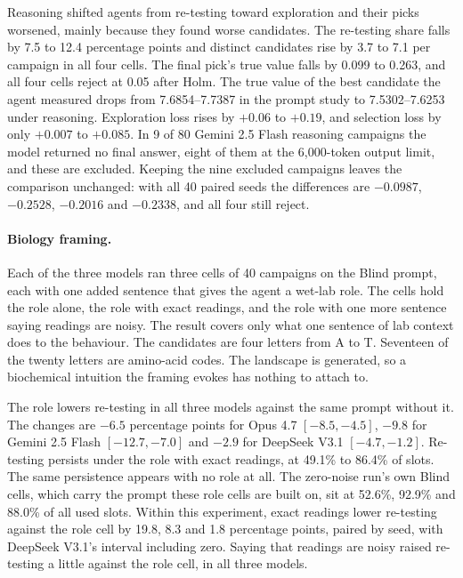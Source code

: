 Reasoning shifted agents from re-testing toward exploration and their picks worsened, mainly because they
found worse candidates. The re-testing share falls by 7.5 to 12.4 percentage points and distinct candidates
rise by 3.7 to 7.1 per campaign in all four cells. The final pick's true value falls by 0.099 to 0.263,
and all four cells reject at 0.05 after Holm. The true value of the best candidate the agent measured drops
from 7.6854--7.7387 in the prompt study to 7.5302--7.6253 under reasoning. Exploration loss rises by $+0.06$ to $+0.19$, and selection loss by only $+0.007$ to $+0.085$. In 9 of 80 Gemini 2.5 Flash reasoning campaigns the model returned no final answer, eight of them at the 6{,}000-token output limit, and these are excluded. Keeping the nine excluded campaigns
leaves the comparison unchanged: with all 40 paired seeds the differences are $-0.0987$, $-0.2528$,
$-0.2016$ and $-0.2338$, and all four still reject.



\paragraph{Biology framing.}
\label{app:bio}
Each of the three models ran three cells of 40 campaigns on the Blind prompt, each with one added sentence that gives the agent a wet-lab role. The cells hold the role alone, the role with exact readings, and the role with one more sentence saying readings are noisy. The result covers only what one sentence of lab context does to the behaviour. The candidates are four letters from A to T. Seventeen of the twenty letters are amino-acid codes. The landscape is generated, so a biochemical intuition the framing evokes has nothing to attach to.

The role lowers re-testing in all three models against the same prompt without it. The changes are $-6.5$ percentage points
for Opus 4.7 $[-8.5, -4.5]$, $-9.8$ for Gemini 2.5 Flash $[-12.7, -7.0]$ and $-2.9$ for
DeepSeek V3.1 $[-4.7, -1.2]$. Re-testing persists under the role with exact readings, at 49.1\% to
86.4\% of slots. The same persistence appears with no role at all. The zero-noise run's own Blind cells, which carry the
prompt these role cells are built on, sit at 52.6\%, 92.9\% and 88.0\% of all used slots. Within this experiment, exact readings lower re-testing against the role cell by 19.8, 8.3 and 1.8 percentage points, paired by
seed, with DeepSeek V3.1's interval including zero. Saying that readings are noisy raised re-testing a little against the role cell, in all three models.

